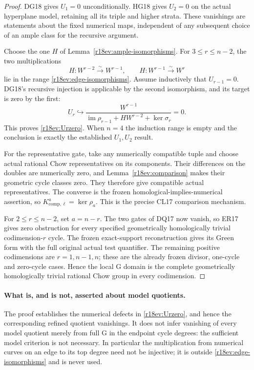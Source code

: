 \begin{proof}
DG18 gives $U_1=0$ unconditionally.  HG18 gives $U_2=0$
on the actual hyperplane model, retaining all its triple
and higher strata.  These vanishings are statements about
the fixed numerical maps, independent of any subsequent
choice of an ample class for the recursive argument.

Choose the one $H$ of Lemma~\ref{r18ev:ample-isomorphisms}.
For $3\le r\le n-2$, the two multiplications
\[
    H:W^{r-2}\xrightarrow{\ \sim\ }W^{r-1},
       \qquad
    H:W^{r-1}\xrightarrow{\ \sim\ }W^r
 \tag{EV18.11}\label{r18ev:induction-pair}
\]
lie in the range \eqref{r18ev:edge-isomorphisms}.
Assume inductively that $U_{r-1}=0$.
DG18's recursive injection is applicable by the second
isomorphism, and its target is zero by the first:
\[
       U_r\hookrightarrow
       \frac{W^{r-1}}{\operatorname{im}\rho_{r-1}
                      +H W^{r-2}+\ker\sigma_r}=0.
\]
This proves \eqref{r18ev:Urzero}.  When $n=4$ the
induction range is empty and the conclusion is exactly
the established $U_1,U_2$ result.

For the representative gate, take any numerically compatible
tuple and choose actual rational Chow representatives on
its components.  Their differences on the doubles are
numerically zero, and Lemma~\ref{r18ev:comparison} makes
their geometric cycle classes zero.  They therefore give
compatible actual representatives.  The converse is the
frozen homological-implies-numerical assertion, so
$K_{\mathrm{comp},\ell}^a=\ker\rho_a$.
This is the precise CL17 comparison mechanism.

For $2\le r\le n-2$, set $a=n-r$.
The two gates of DQ17 now vanish, so ER17 gives zero
obstruction for every specified geometrically homologically
trivial codimension-$r$ cycle.
The frozen exact-support reconstruction gives its Green form
with the full original actual test quantifier.
The remaining positive codimensions are $r=1,n-1,n$;
these are the already frozen divisor, one-cycle and
zero-cycle cases.  Hence the local G domain is the complete
geometrically homologically trivial rational Chow group in
every codimension.
\end{proof}

\paragraph{What is, and is not, asserted about model quotients.}
The proof establishes the numerical defects in
\eqref{r18ev:Urzero}, and hence the corresponding refined
quotient vanishings.  It does not infer vanishing of every
model quotient merely from full G in the endpoint cycle
degrees: the sufficient model criterion is not necessary.
In particular the multiplication from numerical curves on
an edge to its top degree need not be injective; it is
outside \eqref{r18ev:edge-isomorphisms} and is never used.

